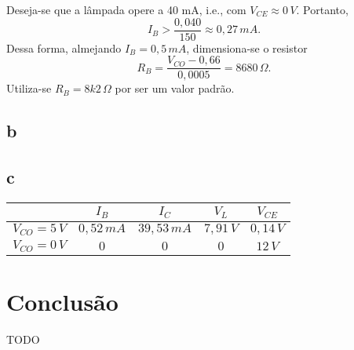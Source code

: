 \documentclass[a4paper]{report}
\begin{document}
Deseja-se que a lâmpada opere a 40 mA, i.e., com $V_{CE}\approx 0\,V$. Portanto, \[
I_B > \frac{0,040}{150} \approx 0,27\,mA
.\] Dessa forma, almejando $I_B = 0,5\,mA$, dimensiona-se o resistor \[
R_B = \frac{V_{CO}-0,66}{0,0005} = 8680\,\Omega
.\] Utiliza-se $R_B = 8k2\,\Omega$ por ser um valor padrão.

\subsection*{b}

\subsection*{c}

\begin{table}[H]
    \centering
    \begin{tabular}{c | c | c | c | c}
     & $I_B$ & $I_C$ & $V_L$ & $V_{CE}$ \\
     \hline
	$V_{CO} = 5\,V$ & $0,52\,mA$ & $39,53\,mA$ & $7,91\,V$ & $0,14\,V$ \\
	$V_{CO} = 0\,V$ & $0$ & $0$ & $0$ & $12\,V$
    \end{tabular}
\end{table}

\section{Conclusão}

TODO
\end{document}
